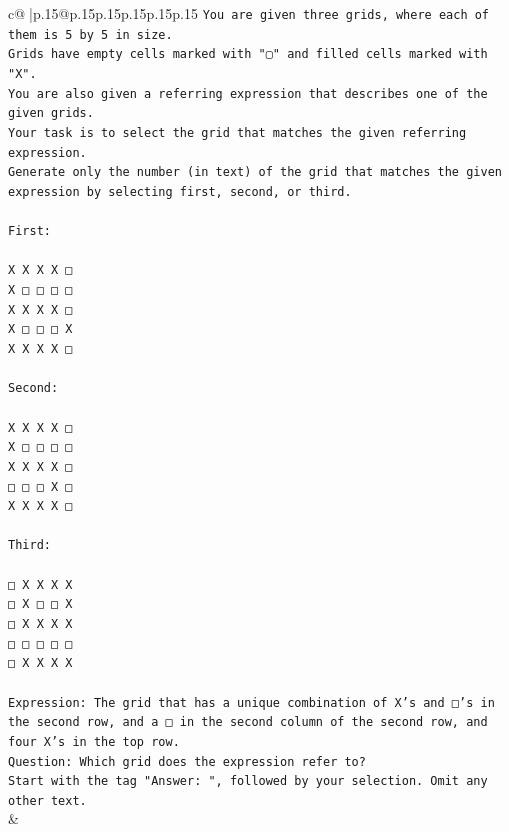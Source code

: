 \documentclass{article}
\begin{document}
{\begin{supertabular}{c@{$\;$}|p{.15\linewidth}@{}p{.15\linewidth}p{.15\linewidth}p{.15\linewidth}p{.15\linewidth}p{.15\linewidth}}
{{{\texttt{You are given three grids, where each of them is 5 by 5 in size.} \\
\texttt{Grids have empty cells marked with "▢" and filled cells marked with "X".} \\
\texttt{You are also given a referring expression that describes one of the given grids.} \\
\texttt{Your task is to select the grid that matches the given referring expression.} \\
\texttt{Generate only the number (in text) of the grid that matches the given expression by selecting first, second, or third.} \\
\\ 
\texttt{First:} \\
\\ 
\texttt{X X X X □} \\
\texttt{X □ □ □ □} \\
\texttt{X X X X □} \\
\texttt{X □ □ □ X} \\
\texttt{X X X X □} \\
\\ 
\texttt{Second:} \\
\\ 
\texttt{X X X X □} \\
\texttt{X □ □ □ □} \\
\texttt{X X X X □} \\
\texttt{□ □ □ X □} \\
\texttt{X X X X □} \\
\\ 
\texttt{Third:} \\
\\ 
\texttt{□ X X X X} \\
\texttt{□ X □ □ X} \\
\texttt{□ X X X X} \\
\texttt{□ □ □ □ □} \\
\texttt{□ X X X X} \\
\\ 
\texttt{Expression: The grid that has a unique combination of X's and □'s in the second row, and a □ in the second column of the second row, and four X's in the top row.} \\
\texttt{Question: Which grid does the expression refer to?} \\
\texttt{Start with the tag "Answer: ", followed by your selection. Omit any other text.} \\
            }
        }
    }
    & \\ \\


\end{supertabular}}
\end{document}
